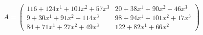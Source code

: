 \documentclass[preview]{standalone}
\begin{document}
\begin{align*}
A = \begin{pmatrix}116 + 124x^{1} + 101x^{2} + 57x^{3} & 20 + 38x^{1} + 90x^{2} + 46x^{3} \\ 9 + 30x^{1} + 91x^{2} + 114x^{3} & 98 + 94x^{1} + 101x^{2} + 17x^{3} \\ 84 + 71x^{1} + 27x^{2} + 49x^{3} & 122 + 82x^{1} + 66x^{2}\end{pmatrix}
\end{align*}
\end{document}
